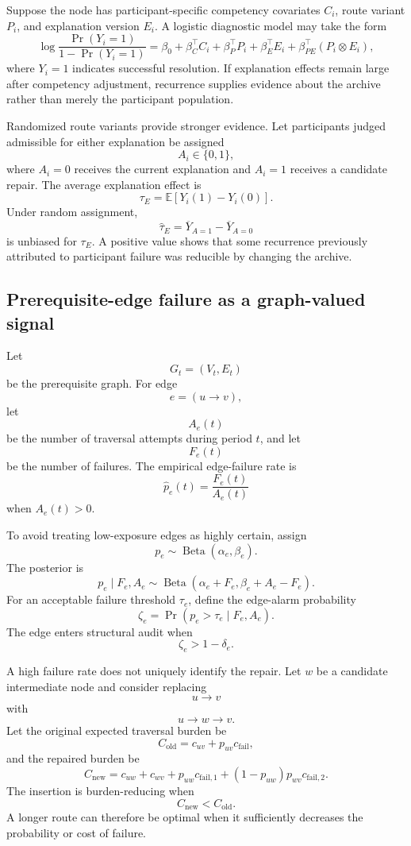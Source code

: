 \documentclass[11pt]{article}
\theoremstyle{definition}
\DeclareMathOperator{\Prob}{Pr}
\newcommand{\E}{\mathbb{E}}
\begin{document}
Suppose the node has participant-specific competency covariates \(C_i\), route variant \(P_i\), and explanation version \(E_i\). A logistic diagnostic model may take the form
\[
\log
\frac{
\Prob(Y_i=1)
}{
1-\Prob(Y_i=1)
}
=
\beta_0
+
\beta_C^{\top}C_i
+
\beta_P^{\top}P_i
+
\beta_E^{\top}E_i
+
\beta_{PE}^{\top}(P_i\otimes E_i),
\]
where \(Y_i=1\) indicates successful resolution. If explanation effects remain large after competency adjustment, recurrence supplies evidence about the archive rather than merely the participant population.

Randomized route variants provide stronger evidence. Let participants judged admissible for either explanation be assigned
\[
A_i\in\{0,1\},
\]
where \(A_i=0\) receives the current explanation and \(A_i=1\) receives a candidate repair. The average explanation effect is
\[
\tau_E
=
\E[Y_i(1)-Y_i(0)].
\]
Under random assignment,
\[
\widehat{\tau}_E
=
\overline{Y}_{A=1}
-
\overline{Y}_{A=0}
\]
is unbiased for \(\tau_E\). A positive value shows that some recurrence previously attributed to participant failure was reducible by changing the archive.

\subsection{Prerequisite-edge failure as a graph-valued signal}

Let
\[
G_t=(V_t,E_t)
\]
be the prerequisite graph. For edge
\[
e=(u\to v),
\]
let
\[
A_e(t)
\]
be the number of traversal attempts during period \(t\), and let
\[
F_e(t)
\]
be the number of failures. The empirical edge-failure rate is
\[
\widehat p_e(t)
=
\frac{F_e(t)}{A_e(t)}
\]
when \(A_e(t)>0\).

To avoid treating low-exposure edges as highly certain, assign
\[
p_e
\sim
\operatorname{Beta}(\alpha_e,\beta_e).
\]
The posterior is
\[
p_e\mid F_e,A_e
\sim
\operatorname{Beta}
\left(
\alpha_e+F_e,
\beta_e+A_e-F_e
\right).
\]
For an acceptable failure threshold \(\tau_e\), define the edge-alarm probability
\[
\zeta_e
=
\Prob(p_e>\tau_e\mid F_e,A_e).
\]
The edge enters structural audit when
\[
\zeta_e>1-\delta_e.
\]

A high failure rate does not uniquely identify the repair. Let \(w\) be a candidate intermediate node and consider replacing
\[
u\to v
\]
with
\[
u\to w\to v.
\]
Let the original expected traversal burden be
\[
C_{\mathrm{old}}
=
c_{uv}
+
p_{uv}c_{\mathrm{fail}},
\]
and the repaired burden be
\[
C_{\mathrm{new}}
=
c_{uw}
+
c_{wv}
+
p_{uw}c_{\mathrm{fail},1}
+
(1-p_{uw})p_{wv}c_{\mathrm{fail},2}.
\]
The insertion is burden-reducing when
\[
C_{\mathrm{new}}<C_{\mathrm{old}}.
\]
A longer route can therefore be optimal when it sufficiently decreases the probability or cost of failure.
\end{document}
